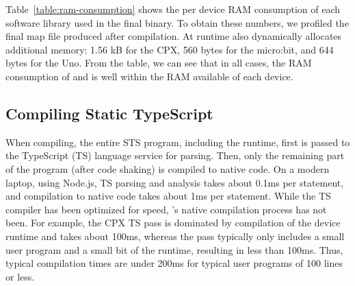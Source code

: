 Table~\ref{table:ram-consumption} shows the per device RAM consumption of each software library used in the final \MC binary. To obtain these numbers, we profiled the final map file produced after compilation. At runtime \MC also dynamically allocates additional memory: 1.56 kB for the CPX, 560 bytes for the micro:bit, and 644 bytes for the Uno. From the table, we can see that in all cases, the RAM consumption of \MC and \CO is well within the RAM available of each device.





\subsection{Compiling Static TypeScript}

When compiling, the entire STS program, including the runtime, first is
passed to the TypeScript (TS) language service for parsing. Then, only the remaining part 
of the program (after code shaking) is compiled to native code.
On a modern laptop, using Node.js, TS parsing and analysis takes about 0.1ms per statement, and \MC compilation to native code takes about 1ms per statement.
While the TS compiler has been optimized for speed, \MCN's native compilation process has not been. For example, the CPX TS pass is dominated by compilation of the device runtime and takes about 100ms, whereas the \MC pass typically only includes a small user program and a small bit of the runtime, resulting in less than 100ms. Thus, typical compilation times are under 200ms for typical user programs of 100 lines or less.

